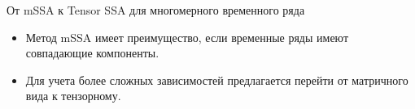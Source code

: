 \begin{frame}{От mSSA к Tensor SSA для многомерного временного ряда}
\begin{itemize}
    \item Метод mSSA имеет преимущество, если временные ряды имеют совпадающие компоненты.
    \item Для учета более сложных зависимостей предлагается перейти от матричного вида к тензорному.
\end{itemize}

\end{frame}
